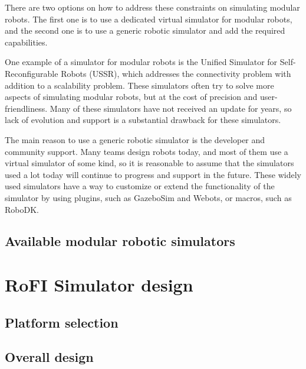 \documentclass[
  digital, %
  table,   %
  oneside, %
  nolof,     %
  nolot,     %
]{fithesis3}
\begin{document}
There are two options on how to address these constraints on simulating modular robots.
The first one is to use a dedicated virtual simulator for modular robots, and the second one is to use a generic robotic simulator and add the required capabilities.

One example of a simulator for modular robots is the Unified Simulator for Self-Reconfigurable Robots (USSR)\cite{ussr}, which addresses
the connectivity problem with addition to a scalability problem.
These simulators often try to solve more aspects of simulating modular robots, but at the cost of precision and user-friendliness.
Many of these simulators have not received an update for years, so lack of evolution and support is a substantial drawback for these simulators.

The main reason to use a generic robotic simulator is the developer and community support.
Many teams design robots today, and most of them use a virtual simulator of some kind, so it is reasonable to assume that the simulators used a lot today will continue to progress and support in the future.
These widely used simulators have a way to customize or extend the functionality of the simulator by using plugins, such as GazeboSim\cite{gazebo} and Webots\cite{webots}, or macros, such as RoboDK\cite{robodk}.

\section{Available modular robotic simulators}

\chapter{RoFI Simulator design}

\section{Platform selection}

\section{Overall design}
\end{document}
